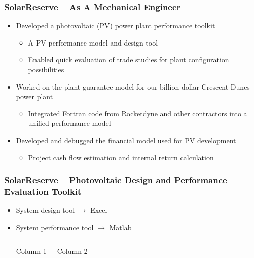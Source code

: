 \documentclass[aspectratio=169]{beamer}
\begin{document}
\begin{frame}
  \frametitle{SolarReserve -- As A Mechanical Engineer}
  \begin{itemize}
  \item Developed a photovoltaic (PV) power plant performance toolkit
    \begin{itemize}
    \item A PV performance model and design tool
    \item Enabled quick evaluation of trade studies for plant
      configuration possibilities
    \end{itemize}
  \item Worked on the plant guarantee model for our billion dollar
    Crescent Dunes power plant
    \begin{itemize}
    \item Integrated Fortran code from Rocketdyne and other
      contractors into a unified performance model
    \end{itemize}
  \item Developed and debugged the financial model used for PV development
    \begin{itemize}
    \item Project cash flow estimation and internal return calculation
    \end{itemize}
  \end{itemize}
\end{frame}

\begin{frame}
  \frametitle{SolarReserve -- Photovoltaic Design and Performance Evaluation Toolkit}
  \begin{itemize}
  \item System design tool $\rightarrow$ Excel
  \item System performance tool $\rightarrow$ Matlab
    \begin{columns}[t]
      \begin{block}{Column 1}
      \end{block}
      \begin{block}{Column 2}
      \end{block}
    \end{columns}
  \end{itemize}
\end{frame}
\end{document}
